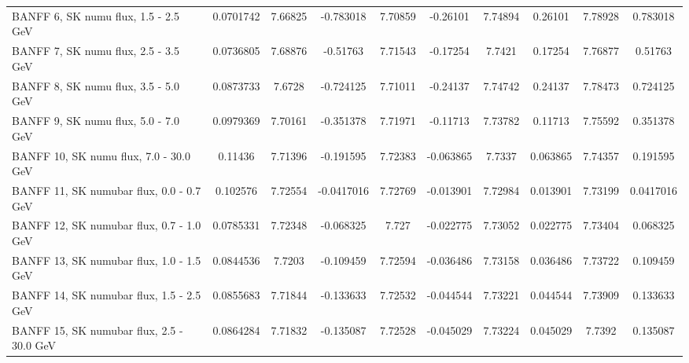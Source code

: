 \documentclass{standalone}
\begin{document}
\begin{tabular}{| l | S | S  S | S  S | S  S | S  S | }
                                           BANFF  6, SK numu flux, 1.5 - 2.5 GeV &       0.0701742 &         7.66825 &       -0.783018 &         7.70859 &        -0.26101 &         7.74894 &         0.26101 &         7.78928 &        0.783018 \\ 
                                           BANFF  7, SK numu flux, 2.5 - 3.5 GeV &       0.0736805 &         7.68876 &        -0.51763 &         7.71543 &        -0.17254 &          7.7421 &         0.17254 &         7.76877 &         0.51763 \\ 
                                           BANFF  8, SK numu flux, 3.5 - 5.0 GeV &       0.0873733 &          7.6728 &       -0.724125 &         7.71011 &        -0.24137 &         7.74742 &         0.24137 &         7.78473 &        0.724125 \\ 
                                           BANFF  9, SK numu flux, 5.0 - 7.0 GeV &       0.0979369 &         7.70161 &       -0.351378 &         7.71971 &        -0.11713 &         7.73782 &         0.11713 &         7.75592 &        0.351378 \\ 
                                          BANFF 10, SK numu flux, 7.0 - 30.0 GeV &         0.11436 &         7.71396 &       -0.191595 &         7.72383 &       -0.063865 &          7.7337 &        0.063865 &         7.74357 &        0.191595 \\ 
                                        BANFF 11, SK numubar flux, 0.0 - 0.7 GeV &        0.102576 &         7.72554 &      -0.0417016 &         7.72769 &       -0.013901 &         7.72984 &        0.013901 &         7.73199 &       0.0417016 \\ 
                                        BANFF 12, SK numubar flux, 0.7 - 1.0 GeV &       0.0785331 &         7.72348 &       -0.068325 &           7.727 &       -0.022775 &         7.73052 &        0.022775 &         7.73404 &        0.068325 \\ 
                                        BANFF 13, SK numubar flux, 1.0 - 1.5 GeV &       0.0844536 &          7.7203 &       -0.109459 &         7.72594 &       -0.036486 &         7.73158 &        0.036486 &         7.73722 &        0.109459 \\ 
                                        BANFF 14, SK numubar flux, 1.5 - 2.5 GeV &       0.0855683 &         7.71844 &       -0.133633 &         7.72532 &       -0.044544 &         7.73221 &        0.044544 &         7.73909 &        0.133633 \\ 
                                       BANFF 15, SK numubar flux, 2.5 - 30.0 GeV &       0.0864284 &         7.71832 &       -0.135087 &         7.72528 &       -0.045029 &         7.73224 &        0.045029 &          7.7392 &        0.135087 \\ 

\end{tabular}
\end{document}
